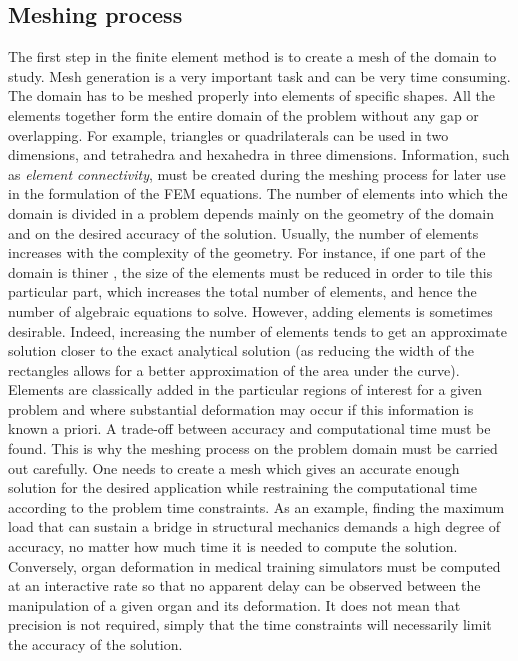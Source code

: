 	\subsection{Meshing process}
The first step in the finite element method is to create a mesh of the domain to study. Mesh generation is a very important task and can be very time consuming. The domain has to be meshed properly into elements of specific shapes. All the elements together form the entire domain of the problem without any gap or overlapping. For example, triangles or quadrilaterals can be used in two dimensions, and tetrahedra and hexahedra in three dimensions. Information, such as \emph{element connectivity}, must be created during the meshing process for later use in the formulation of the FEM equations. The number of elements into which the domain is divided in a problem depends mainly on the geometry of the domain and on the desired accuracy of the solution. Usually, the number of elements increases with the complexity of the geometry. For instance, if one part of the domain is thiner , the size of the elements must be reduced in order to tile this particular part, which increases the total number of elements, and hence  the number of algebraic equations to solve. However, adding elements is sometimes desirable. Indeed, increasing the number of elements tends to get an approximate solution closer to the exact analytical solution (as reducing the width of the rectangles allows for a better approximation of the area under the curve). Elements are classically added in the particular regions of interest for a given problem and where substantial deformation may occur if this information is known a priori. A trade-off between accuracy and computational time must be found. This is why the meshing process on the problem domain must be carried out carefully. One needs to create a mesh which gives an accurate enough solution for the desired application while restraining the computational time according to the problem time constraints. As an example, finding the maximum load that can sustain a bridge in structural mechanics demands a high degree of accuracy, no matter how much time it is needed to compute the solution. Conversely, organ deformation in medical training simulators must be computed at an interactive rate so that no apparent delay can be observed between the manipulation of a given organ and its deformation. It does not mean that precision is not required, simply that the time constraints will necessarily limit the accuracy of the solution. 

